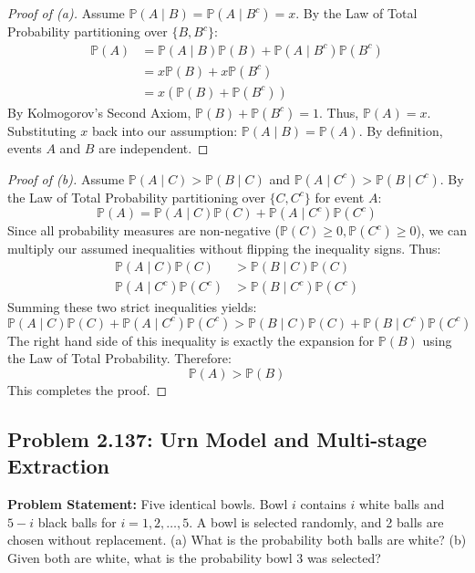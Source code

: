 \documentclass[12pt]{article}
\begin{document}
\begin{proof}[Proof of (a)]
Assume $\mathbb{P}(A \mid B) = \mathbb{P}(A \mid B^c) = x$.
By the Law of Total Probability partitioning over $\{B, B^c\}$:
\begin{align*}
    \mathbb{P}(A) &= \mathbb{P}(A \mid B)\mathbb{P}(B) + \mathbb{P}(A \mid B^c)\mathbb{P}(B^c) \\
    &= x\mathbb{P}(B) + x\mathbb{P}(B^c) \\
    &= x(\mathbb{P}(B) + \mathbb{P}(B^c))
\end{align*}
By Kolmogorov's Second Axiom, $\mathbb{P}(B) + \mathbb{P}(B^c) = 1$. Thus, $\mathbb{P}(A) = x$.
Substituting $x$ back into our assumption: $\mathbb{P}(A \mid B) = \mathbb{P}(A)$. By definition, events $A$ and $B$ are independent. 
\end{proof}

\begin{proof}[Proof of (b)]
Assume $\mathbb{P}(A \mid C) > \mathbb{P}(B \mid C)$ and $\mathbb{P}(A \mid C^c) > \mathbb{P}(B \mid C^c)$.
By the Law of Total Probability partitioning over $\{C, C^c\}$ for event $A$:
\begin{equation} \label{eq:ineq1}
    \mathbb{P}(A) = \mathbb{P}(A \mid C)\mathbb{P}(C) + \mathbb{P}(A \mid C^c)\mathbb{P}(C^c)
\end{equation}
Since all probability measures are non-negative ($\mathbb{P}(C) \ge 0, \mathbb{P}(C^c) \ge 0$), we can multiply our assumed inequalities without flipping the inequality signs. Thus:
\begin{align*}
    \mathbb{P}(A \mid C)\mathbb{P}(C) &> \mathbb{P}(B \mid C)\mathbb{P}(C) \\
    \mathbb{P}(A \mid C^c)\mathbb{P}(C^c) &> \mathbb{P}(B \mid C^c)\mathbb{P}(C^c)
\end{align*}
Summing these two strict inequalities yields:
\[ \mathbb{P}(A \mid C)\mathbb{P}(C) + \mathbb{P}(A \mid C^c)\mathbb{P}(C^c) > \mathbb{P}(B \mid C)\mathbb{P}(C) + \mathbb{P}(B \mid C^c)\mathbb{P}(C^c) \]
The right hand side of this inequality is exactly the expansion for $\mathbb{P}(B)$ using the Law of Total Probability. Therefore:
\[ \mathbb{P}(A) > \mathbb{P}(B) \]
This completes the proof.
\end{proof}

\subsection{Problem 2.137: Urn Model and Multi-stage Extraction}
\textbf{Problem Statement:} Five identical bowls. Bowl $i$ contains $i$ white balls and $5-i$ black balls for $i=1, 2, \dots, 5$. A bowl is selected randomly, and 2 balls are chosen without replacement.
(a) What is the probability both balls are white? 
(b) Given both are white, what is the probability bowl 3 was selected?
\end{document}
